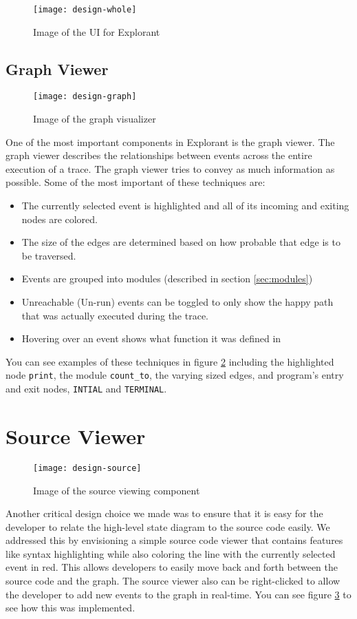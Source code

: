 \begin{figure}[!ht]
    \centering
    \texttt{[image: design-whole]}
    \caption{Image of the UI for Explorant}
    \label{fig:graph-whole}
\end{figure}

\subsection{Graph Viewer}
\begin{figure}[!ht]
    \centering
    \texttt{[image: design-graph]}
    \caption{Image of the graph visualizer}
    \label{fig:graph}
\end{figure}
One of the most important components in Explorant is the graph viewer. The graph viewer describes the relationships between events across the entire execution of a trace. The graph viewer tries to convey as much information as possible. Some of the most important of these techniques are: 
\begin{itemize}
    \item The currently selected event is highlighted and all of its incoming and exiting nodes are colored. 
    \item The size of the edges are determined based on how probable that edge is to be traversed. 
    \item Events are grouped into modules (described in section \ref{sec:modules})
    \item Unreachable (Un-run) events can be toggled to only show the happy path that was actually executed during the trace.
    \item Hovering over an event shows what function it was defined in
\end{itemize}
You can see examples of these techniques in figure \ref{fig:graph} including the highlighted node \texttt{print}, the module \texttt{count\_to}, the varying sized edges, and program's entry and exit nodes, \texttt{INTIAL} and \texttt{TERMINAL}. 






\section{Source Viewer}
\begin{figure}[!ht]
    \centering
    \texttt{[image: design-source]}
    \caption{Image of the source viewing component}
    \label{fig:graph-src}
\end{figure}
  Another critical design choice we made was to ensure that it is easy for the developer to relate the high-level state diagram to the source code easily. We addressed this by envisioning a simple source code viewer that contains features like syntax highlighting while also coloring the line with the currently selected event in red. This allows developers to easily move back and forth between the source code and the graph. The source viewer also can be right-clicked to allow the developer to add new events to the graph in real-time. You can see figure \ref{fig:graph-src} to see how this was implemented.

